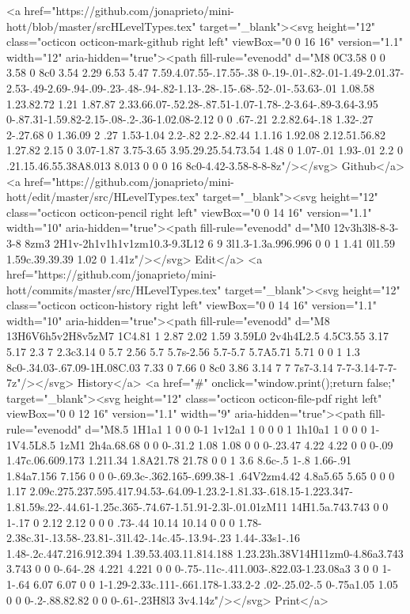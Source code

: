       <a href="https://github.com/jonaprieto/mini-hott/blob/master/srcHLevelTypes.tex" target="_blank"><svg height="12" class="octicon octicon-mark-github right left" viewBox="0 0 16 16" version="1.1" width="12" aria-hidden="true"><path fill-rule="evenodd" d="M8 0C3.58 0 0 3.58 0 8c0 3.54 2.29 6.53 5.47 7.59.4.07.55-.17.55-.38 0-.19-.01-.82-.01-1.49-2.01.37-2.53-.49-2.69-.94-.09-.23-.48-.94-.82-1.13-.28-.15-.68-.52-.01-.53.63-.01 1.08.58 1.23.82.72 1.21 1.87.87 2.33.66.07-.52.28-.87.51-1.07-1.78-.2-3.64-.89-3.64-3.95 0-.87.31-1.59.82-2.15-.08-.2-.36-1.02.08-2.12 0 0 .67-.21 2.2.82.64-.18 1.32-.27 2-.27.68 0 1.36.09 2 .27 1.53-1.04 2.2-.82 2.2-.82.44 1.1.16 1.92.08 2.12.51.56.82 1.27.82 2.15 0 3.07-1.87 3.75-3.65 3.95.29.25.54.73.54 1.48 0 1.07-.01 1.93-.01 2.2 0 .21.15.46.55.38A8.013 8.013 0 0 0 16 8c0-4.42-3.58-8-8-8z"/></svg> Github</a>
      <a href="https://github.com/jonaprieto/mini-hott/edit/master/src/HLevelTypes.tex" target="_blank"><svg height="12" class="octicon octicon-pencil right left" viewBox="0 0 14 16" version="1.1" width="10" aria-hidden="true"><path fill-rule="evenodd" d="M0 12v3h3l8-8-3-3-8 8zm3 2H1v-2h1v1h1v1zm10.3-9.3L12 6 9 3l1.3-1.3a.996.996 0 0 1 1.41 0l1.59 1.59c.39.39.39 1.02 0 1.41z"/></svg> Edit</a>
      <a href="https://github.com/jonaprieto/mini-hott/commits/master/src/HLevelTypes.tex" target="_blank"><svg height="12" class="octicon octicon-history right left" viewBox="0 0 14 16" version="1.1" width="10" aria-hidden="true"><path fill-rule="evenodd" d="M8 13H6V6h5v2H8v5zM7 1C4.81 1 2.87 2.02 1.59 3.59L0 2v4h4L2.5 4.5C3.55 3.17 5.17 2.3 7 2.3c3.14 0 5.7 2.56 5.7 5.7s-2.56 5.7-5.7 5.7A5.71 5.71 0 0 1 1.3 8c0-.34.03-.67.09-1H.08C.03 7.33 0 7.66 0 8c0 3.86 3.14 7 7 7s7-3.14 7-7-3.14-7-7-7z"/></svg> History</a>
      <a  href="#" onclick="window.print();return false;" target="_blank"><svg height="12" class="octicon octicon-file-pdf right left" viewBox="0 0 12 16" version="1.1" width="9" aria-hidden="true"><path fill-rule="evenodd" d="M8.5 1H1a1 1 0 0 0-1 1v12a1 1 0 0 0 1 1h10a1 1 0 0 0 1-1V4.5L8.5 1zM1 2h4a.68.68 0 0 0-.31.2 1.08 1.08 0 0 0-.23.47 4.22 4.22 0 0 0-.09 1.47c.06.609.173 1.211.34 1.8A21.78 21.78 0 0 1 3.6 8.6c-.5 1-.8 1.66-.91 1.84a7.156 7.156 0 0 0-.69.3c-.362.165-.699.38-1 .64V2zm4.42 4.8a5.65 5.65 0 0 0 1.17 2.09c.275.237.595.417.94.53-.64.09-1.23.2-1.81.33-.618.15-1.223.347-1.81.59s.22-.44.61-1.25c.365-.74.67-1.51.91-2.3l-.01.01zM11 14H1.5a.743.743 0 0 1-.17 0 2.12 2.12 0 0 0 .73-.44 10.14 10.14 0 0 0 1.78-2.38c.31-.13.58-.23.81-.31l.42-.14c.45-.13.94-.23 1.44-.33s1-.16 1.48-.2c.447.216.912.394 1.39.53.403.11.814.188 1.23.23h.38V14H11zm0-4.86a3.743 3.743 0 0 0-.64-.28 4.221 4.221 0 0 0-.75-.11c-.411.003-.822.03-1.23.08a3 3 0 0 1-1-.64 6.07 6.07 0 0 1-1.29-2.33c.111-.661.178-1.33.2-2 .02-.25.02-.5 0-.75a1.05 1.05 0 0 0-.2-.88.82.82 0 0 0-.61-.23H8l3 3v4.14z"/></svg> Print</a>
